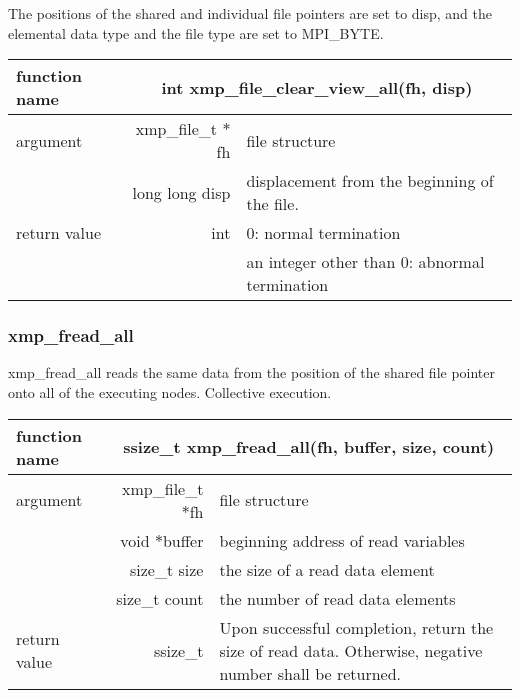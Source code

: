    The positions of the shared and individual file pointers are set to
   disp, and 
   the elemental data type and the file type are set to MPI\_BYTE.
   
   \begin{table}[h]
    \begin{center}
     \begin{tabular}{|l|r|p{80mm}|}
      \hline
      {\bf function name}  & \multicolumn{2}{c|}{\bf int xmp\_file\_clear\_view\_all(fh,
      disp)} \\ \hline \hline
      argument & xmp\_file\_t $*$fh & file structure \\ \cline{2-3}
      & long long disp & displacement from the beginning of the file. \\ \hline
      return value & int & 0: normal termination \\
      &  & an integer other than 0: abnormal termination \\ \hline
      \end{tabular}
     \end{center}
    \label{tb:aaa}
   \end{table}

   \subsubsection{xmp\_fread\_all}
   xmp\_fread\_all reads the same data from the position of the shared file
   pointer onto all of the executing nodes. Collective execution.

   \begin{table}[h]
    \begin{center}
     \begin{tabular}{|l|r|p{80mm}|}
      \hline
      {\bf function name}  & \multicolumn{2}{c|}{\bf ssize\_t
      xmp\_fread\_all(fh, buffer, size, count)}  \\ \hline \hline
      argument & xmp\_file\_t $*$fh & file structure \\ \cline{2-3}
      & void $*$buffer & beginning address of read variables \\ \cline{2-3}
      & size\_t size & the size of a read data element \\ \cline{2-3}
      & size\_t count & the number of read data elements \\ \hline
      return value & ssize\_t & Upon successful completion, return the size
	      of read data. Otherwise, negative number shall be
	      returned. \\ \hline
      \end{tabular}
     \end{center}
    \label{tb:aaa}
   \end{table}

